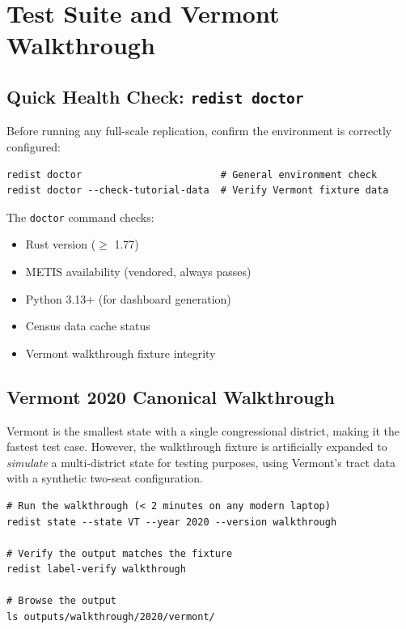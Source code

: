 
\section{Test Suite and Vermont Walkthrough}
\label{sec:testsuite}

\subsection*{Quick Health Check: \texttt{redist doctor}}

Before running any full-scale replication, confirm the environment is
correctly configured:

\begin{verbatim}
redist doctor                        # General environment check
redist doctor --check-tutorial-data  # Verify Vermont fixture data
\end{verbatim}

\noindent The \texttt{doctor} command checks:
\begin{itemize}[itemsep=2pt]
  \item Rust version ($\geq$ 1.77)
  \item METIS availability (vendored, always passes)
  \item Python 3.13+ (for dashboard generation)
  \item Census data cache status
  \item Vermont walkthrough fixture integrity
\end{itemize}

\subsection*{Vermont 2020 Canonical Walkthrough}

Vermont is the smallest state with a single congressional district,
making it the fastest test case.
However, the walkthrough fixture is artificially expanded to
\textit{simulate} a multi-district state for testing purposes,
using Vermont's tract data with a synthetic two-seat configuration.

\begin{verbatim}
# Run the walkthrough (< 2 minutes on any modern laptop)
redist state --state VT --year 2020 --version walkthrough

# Verify the output matches the fixture
redist label-verify walkthrough

# Browse the output
ls outputs/walkthrough/2020/vermont/
\end{verbatim}

